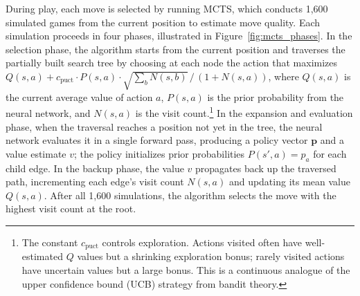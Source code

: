 During play, each move is selected by running MCTS, which conducts 1,600 simulated games from the current position to estimate move quality. Each simulation proceeds in four phases, illustrated in Figure~\ref{fig:mcts_phases}. In the selection phase, the algorithm starts from the current position and traverses the partially built search tree by choosing at each node the action that maximizes $Q(s,a) + c_{\text{puct}} \cdot P(s,a) \cdot \sqrt{\sum_b N(s,b)} \,/\, (1 + N(s,a))$, where $Q(s,a)$ is the current average value of action $a$, $P(s,a)$ is the prior probability from the neural network, and $N(s,a)$ is the visit count.\footnote{The constant $c_{\text{puct}}$ controls exploration. Actions visited often have well-estimated $Q$ values but a shrinking exploration bonus; rarely visited actions have uncertain values but a large bonus. This is a continuous analogue of the upper confidence bound (UCB) strategy from bandit theory.} In the expansion and evaluation phase, when the traversal reaches a position not yet in the tree, the neural network evaluates it in a single forward pass, producing a policy vector $\mathbf{p}$ and a value estimate $v$; the policy initializes prior probabilities $P(s',a) = p_a$ for each child edge. In the backup phase, the value $v$ propagates back up the traversed path, incrementing each edge's visit count $N(s,a)$ and updating its mean value $Q(s,a)$. After all 1,600 simulations, the algorithm selects the move with the highest visit count at the root.

